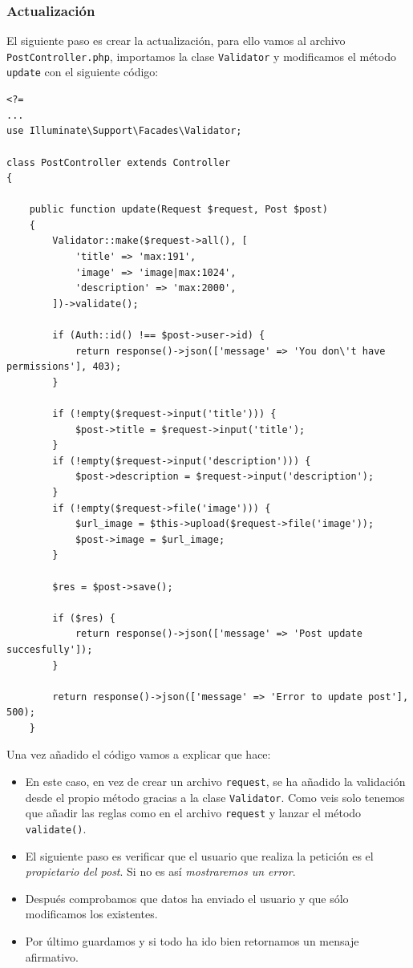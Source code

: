 \documentclass[11pt]{article}
\begin{document}
\subsubsection{Actualización}
\label{sec:org622f04b}
El siguiente paso es crear la actualización, para ello vamos al
archivo \texttt{PostController.php}, importamos la clase \texttt{Validator} y
modificamos el método \texttt{update} con el siguiente código:
\begin{verbatim}
<?=
...
use Illuminate\Support\Facades\Validator;

class PostController extends Controller
{

    public function update(Request $request, Post $post)
    {
        Validator::make($request->all(), [
            'title' => 'max:191',
            'image' => 'image|max:1024',
            'description' => 'max:2000',
        ])->validate();

        if (Auth::id() !== $post->user->id) {
            return response()->json(['message' => 'You don\'t have permissions'], 403);
        }

        if (!empty($request->input('title'))) {
            $post->title = $request->input('title');
        }
        if (!empty($request->input('description'))) {
            $post->description = $request->input('description');
        }
        if (!empty($request->file('image'))) {
            $url_image = $this->upload($request->file('image'));
            $post->image = $url_image;
        }

        $res = $post->save();

        if ($res) {
            return response()->json(['message' => 'Post update succesfully']);
        }

        return response()->json(['message' => 'Error to update post'], 500);
    }
\end{verbatim}

Una vez añadido el código vamos a explicar que hace:

\begin{itemize}
\item En este caso, en vez de crear un archivo \texttt{request}, se ha añadido la
validación desde el propio método gracias a la clase \texttt{Validator}. Como
veis solo tenemos que añadir las reglas como en el archivo \texttt{request} y
lanzar el método \texttt{validate()}.
\item El siguiente paso es verificar que el usuario que realiza la
petición es el \emph{propietario del post}. Si no es así \emph{mostraremos un
error}.
\item Después comprobamos que datos ha enviado el usuario y que sólo
modificamos los existentes.
\item Por último guardamos y si todo ha ido bien retornamos un mensaje
afirmativo.
\end{itemize}
\end{document}
